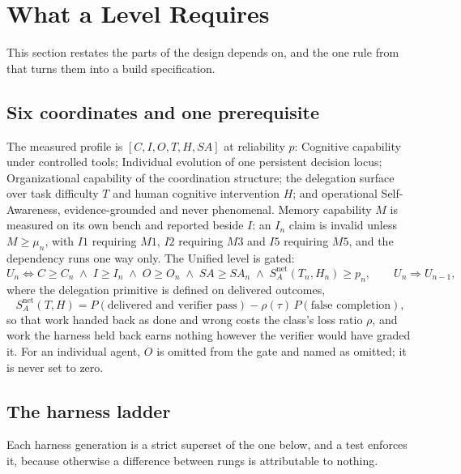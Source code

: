 \section{What a Level Requires}\label{sec:requires}

This section restates the parts of \citet{yang2026unified} the design depends on, and the one rule from \citet{yang2026designing} that turns them into a build specification.

\subsection{Six coordinates and one prerequisite}

The measured profile is $[C,I,O,T,H,SA]$ at reliability $p$: Cognitive capability under controlled tools; Individual evolution of one persistent decision locus; Organizational capability of the coordination structure; the delegation surface over task difficulty $T$ and human cognitive intervention $H$; and operational Self-Awareness, evidence-grounded and never phenomenal. Memory capability $M$ is measured on its own bench and reported beside $I$: an $I_n$ claim is invalid unless $M \ge \mu_n$, with $I1$ requiring $M1$, $I2$ requiring $M3$ and $I5$ requiring $M5$, and the dependency runs one way only. The Unified level is gated:
\[
U_n \iff C \ge C_n \;\wedge\; I \ge I_n \;\wedge\; O \ge O_n \;\wedge\; SA \ge SA_n \;\wedge\; S^{\text{net}}_A(T_n,H_n) \ge p_n,
\qquad U_n \Rightarrow U_{n-1},
\]
where the delegation primitive is defined on delivered outcomes,
\[
S^{\text{net}}_A(T,H) = P(\text{delivered and verifier pass}) - \rho(\tau)\,P(\text{false completion}),
\]
so that work handed back as done and wrong costs the class's loss ratio $\rho$, and work the harness held back earns nothing however the verifier would have graded it. For an individual agent, $O$ is omitted from the gate and named as omitted; it is never set to zero.

\subsection{The harness ladder}

Each harness generation is a strict superset of the one below, and a test enforces it, because otherwise a difference between rungs is attributable to nothing.


